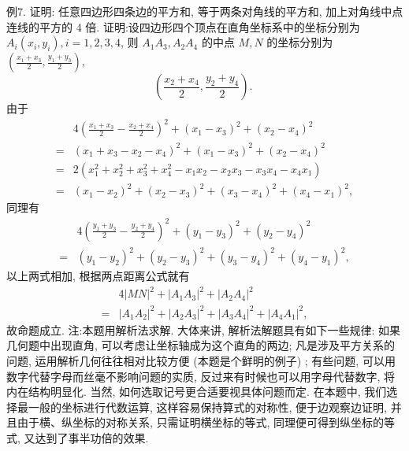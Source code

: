 例7. 证明: 任意四边形四条边的平方和, 等于两条对角线的平方和, 加上对角线中点连线的平方的 4 倍.
证明:设四边形四个顶点在直角坐标系中的坐标分别为 $A_i\left(x_i, y_i\right), i= 1,2,3,4$, 则 $A_1 A_3, A_2 A_4$ 的中点 $M, N$ 的坐标分别为 $\left(\frac{x_1+x_3}{2}, \frac{y_1+y_3}{2}\right)$,
$$
\left(\frac{x_2+x_4}{2}, \frac{y_2+y_4}{2}\right) \text {. }
$$
由于
$$
\begin{aligned}
& 4\left(\frac{x_1+x_3}{2}-\frac{x_2+x_4}{2}\right)^2+\left(x_1-x_3\right)^2+\left(x_2-x_4\right)^2 \\
= & \left(x_1+x_3-x_2-x_4\right)^2+\left(x_1-x_3\right)^2+\left(x_2-x_4\right)^2 \\
= & 2\left(x_1^2+x_2^2+x_3^2+x_4^2-x_1 x_2-x_2 x_3-x_3 x_4-x_4 x_1\right) \\
= & \left(x_1-x_2\right)^2+\left(x_2-x_3\right)^2+\left(x_3-x_4\right)^2+\left(x_4-x_1\right)^2,
\end{aligned}
$$
同理有
$$
\begin{aligned}
& 4\left(\frac{y_1+y_3}{2}-\frac{y_2+y_4}{2}\right)^2+\left(y_1-y_3\right)^2+\left(y_2-y_4\right)^2 \\
= & \left(y_1-y_2\right)^2+\left(y_2-y_3\right)^2+\left(y_3-y_4\right)^2+\left(y_4-y_1\right)^2,
\end{aligned}
$$
以上两式相加, 根据两点距离公式就有
$$
\begin{aligned}
& 4|M N|^2+\left|A_1 A_3\right|^2+\left|A_2 A_4\right|^2 \\
= & \left|A_1 A_2\right|^2+\left|A_2 A_3\right|^2+\left|A_3 A_4\right|^2+\left|A_4 A_1\right|^2,
\end{aligned}
$$
故命题成立.
注:本题用解析法求解.
大体来讲, 解析法解题具有如下一些规律:
如果几何题中出现直角, 可以考虑让坐标轴成为这个直角的两边; 凡是涉及平方关系的问题, 运用解析几何往往相对比较方便 (本题是个鲜明的例子) ; 有些问题, 可以用数字代替字母而丝毫不影响问题的实质, 反过来有时候也可以用字母代替数字, 将内在结构明显化.
当然, 如何选取记号更合适要视具体问题而定.
在本题中, 我们选择最一般的坐标进行代数运算, 这样容易保持算式的对称性, 便于边观察边证明, 并且由于横、纵坐标的对称关系, 只需证明横坐标的等式, 同理便可得到纵坐标的等式, 又达到了事半功倍的效果.



